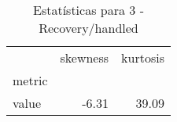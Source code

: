 \begin{table}[htbp]
\caption{Estatísticas para 3 - Recovery/handled}
\label{tab:3_-_recovery_handled_skewkurt}
\begin{tabular}{lrr}
\toprule
 & skewness & kurtosis \\
metric &  &  \\
\midrule
value & -6.31 & 39.09 \\
\bottomrule
\end{tabular}
\end{table}
